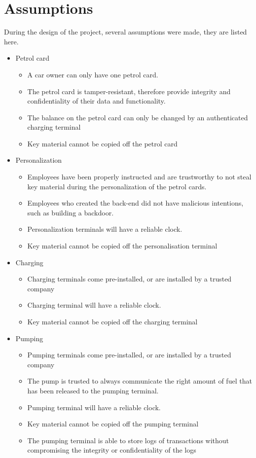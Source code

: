 \section{Assumptions}
During the design of the project, several assumptions were made, they are listed here.
\begin{itemize}
\item Petrol card
\begin{itemize}
	\item A car owner can only have one petrol card.
	\item The petrol card is tamper-resistant, therefore provide integrity and confidentiality of their data and functionality.
	\item The balance on the petrol card can only be changed by an authenticated charging terminal
	\item Key material cannot be copied off the petrol card
\end{itemize}

\item Personalization
\begin{itemize}
\item Employees have been properly instructed and are trustworthy to not steal key material during the personalization of the petrol cards.
\item Employees who created the back-end did not have malicious intentions, such as building a backdoor.
\item Personalization terminals will have a reliable clock.
\item Key material cannot be copied off the personalisation terminal
\end{itemize}

\item Charging
\begin{itemize}
\item Charging terminals come pre-installed, or are installed by a trusted company
\item Charging terminal will have a reliable clock.
\item Key material cannot be copied off the charging terminal
\end{itemize}

\item Pumping
\begin{itemize}
\item Pumping terminals come pre-installed, or are installed by a trusted company
\item The pump is trusted to always communicate the right amount of fuel that has been released to the pumping terminal.
\item Pumping terminal will have a reliable clock.
\item Key material cannot be copied off the pumping terminal
\item The pumping terminal is able to store logs of transactions without compromising the integrity or confidentiality of the logs
\end{itemize}


\end{itemize}

